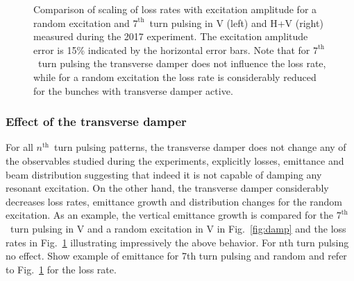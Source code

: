 \documentclass[%
 reprint,
 amsmath,amssymb,
 aps,
prstab,
]{revtex4-1}
\begin{document}
\begin{figure}[h]
\begin{minipage}[t]{0.49\linewidth}
	\end{minipage}	
	\caption{\label{fig:ranexploss}  Comparison of scaling of loss rates with excitation amplitude for a random excitation and $7^{\mathrm{th}}$~turn pulsing in V (left) and H+V (right) measured during the 2017 experiment. The excitation amplitude error is 15\% indicated by the horizontal error bars. Note that for $7^{\mathrm{th}}$~turn pulsing the transverse damper does not influence the loss rate, while for a random excitation the loss rate is considerably reduced for the bunches with transverse damper active.}
\end{figure}

\subsubsection{Effect of the transverse damper\label{sec:damp}}
For all $n^{\mathrm{th}}$~turn pulsing patterns, the transverse damper does not change any of the observables studied during the experiments, explicitly losses, emittance and beam distribution suggesting that indeed it is not capable of damping any resonant excitation. On the other hand, the transverse damper considerably decreases loss rates, emittance growth and distribution changes for the random excitation. As an example, the vertical emittance growth is compared for the $7^{\mathrm{th}}$~turn pulsing in V and a random excitation in V in Fig.~\ref{fig:damp} and the loss rates in Fig.~\ref{fig:ranexploss} illustrating impressively the above behavior. 
For nth turn pulsing no effect. Show example of emittance for 7th turn pulsing and random and refer to Fig.~\ref{fig:ranexploss} for the loss rate.
\end{document}
